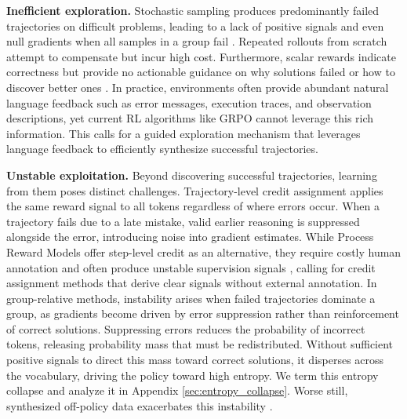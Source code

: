 \documentclass{article} %
\theoremstyle{definition}
\theoremstyle{remark}
\let\cite\citep
\begin{document}
\textbf{Inefficient exploration.} Stochastic sampling produces predominantly failed trajectories on difficult problems, leading to a lack of positive signals and even null gradients when all samples in a group fail \cite{nan2025ngrpo}. Repeated rollouts from scratch attempt to compensate but incur high cost. Furthermore, scalar rewards indicate correctness but provide no actionable guidance on why solutions failed or how to discover better ones \cite{scheurer2022training,scheurer2023training,zhang2025critique}. In practice, environments often provide abundant natural language feedback such as error messages, execution traces, and observation descriptions, yet current RL algorithms like GRPO cannot leverage this rich information. This calls for a guided exploration mechanism that leverages language feedback to efficiently synthesize successful trajectories. 

\textbf{Unstable exploitation.} Beyond discovering successful trajectories, learning from them poses distinct challenges. Trajectory-level credit assignment applies the same reward signal to all tokens regardless of where errors occur. When a trajectory fails due to a late mistake, valid earlier reasoning is suppressed alongside the error, introducing noise into gradient estimates. While Process Reward Models \cite{lightman2023let} offer step-level credit as an alternative, they require costly human annotation and often produce unstable supervision signals \cite{xiong2024watch}, calling for credit assignment methods that derive clear signals without external annotation. In group-relative methods, instability arises when failed trajectories dominate a group, as gradients become driven by error suppression rather than reinforcement of correct solutions. Suppressing errors reduces the probability of incorrect tokens, releasing probability mass that must be redistributed. Without sufficient positive signals to direct this mass toward correct solutions, it disperses across the vocabulary, driving the policy toward high entropy. We term this entropy collapse and analyze it in Appendix \ref{sec:entropy_collapse}. Worse still, synthesized off-policy data exacerbates this instability \cite{wu2025learning}.


\end{document}
